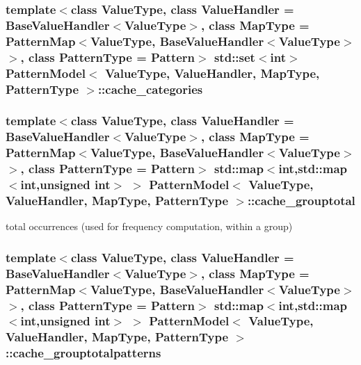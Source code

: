 \subsubsection[{cache\+\_\+categories}]{\setlength{\rightskip}{0pt plus 5cm}template$<$class Value\+Type, class Value\+Handler = Base\+Value\+Handler$<$\+Value\+Type$>$, class Map\+Type = Pattern\+Map$<$\+Value\+Type, Base\+Value\+Handler$<$\+Value\+Type$>$$>$, class Pattern\+Type = Pattern$>$ std\+::set$<$int$>$ {\bf Pattern\+Model}$<$ Value\+Type, Value\+Handler, Map\+Type, {\bf Pattern\+Type} $>$\+::cache\+\_\+categories\hspace{0.3cm}{\ttfamily [protected]}}\label{classPatternModel_a2fa59bed9f90745782983b4041981b88}
\hypertarget{classPatternModel_a9a4c974fe564fcad7471b1e05e231394}{}
\subsubsection[{cache\+\_\+grouptotal}]{\setlength{\rightskip}{0pt plus 5cm}template$<$class Value\+Type, class Value\+Handler = Base\+Value\+Handler$<$\+Value\+Type$>$, class Map\+Type = Pattern\+Map$<$\+Value\+Type, Base\+Value\+Handler$<$\+Value\+Type$>$$>$, class Pattern\+Type = Pattern$>$ std\+::map$<$int,std\+::map$<$int,unsigned int$>$ $>$ {\bf Pattern\+Model}$<$ Value\+Type, Value\+Handler, Map\+Type, {\bf Pattern\+Type} $>$\+::cache\+\_\+grouptotal\hspace{0.3cm}{\ttfamily [protected]}}\label{classPatternModel_a9a4c974fe564fcad7471b1e05e231394}


total occurrences (used for frequency computation, within a group) 

\hypertarget{classPatternModel_abf5c303232c7fcd54bbd73125be4ca53}{}
\subsubsection[{cache\+\_\+grouptotalpatterns}]{\setlength{\rightskip}{0pt plus 5cm}template$<$class Value\+Type, class Value\+Handler = Base\+Value\+Handler$<$\+Value\+Type$>$, class Map\+Type = Pattern\+Map$<$\+Value\+Type, Base\+Value\+Handler$<$\+Value\+Type$>$$>$, class Pattern\+Type = Pattern$>$ std\+::map$<$int,std\+::map$<$int,unsigned int$>$ $>$ {\bf Pattern\+Model}$<$ Value\+Type, Value\+Handler, Map\+Type, {\bf Pattern\+Type} $>$\+::cache\+\_\+grouptotalpatterns\hspace{0.3cm}{\ttfamily [protected]}}\label{classPatternModel_abf5c303232c7fcd54bbd73125be4ca53}


